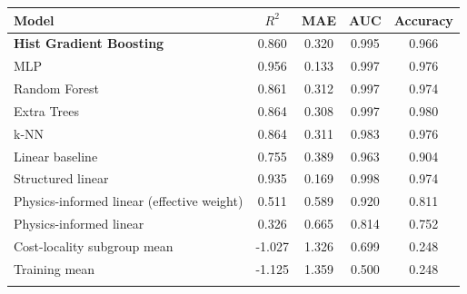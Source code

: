 \begin{tabular}{lcccc}
\toprule
Model & $R^2$ & MAE & AUC & Accuracy \\
\midrule
\textbf{Hist Gradient Boosting} & 0.860 & 0.320 & 0.995 & 0.966 \\
MLP & 0.956 & 0.133 & 0.997 & 0.976 \\
Random Forest & 0.861 & 0.312 & 0.997 & 0.974 \\
Extra Trees & 0.864 & 0.308 & 0.997 & 0.980 \\
k-NN & 0.864 & 0.311 & 0.983 & 0.976 \\
Linear baseline & 0.755 & 0.389 & 0.963 & 0.904 \\
\midrule
Structured linear & 0.935 & 0.169 & 0.998 & 0.974 \\
Physics-informed linear (effective weight) & 0.511 & 0.589 & 0.920 & 0.811 \\
Physics-informed linear & 0.326 & 0.665 & 0.814 & 0.752 \\
Cost-locality subgroup mean & -1.027 & 1.326 & 0.699 & 0.248 \\
Training mean & -1.125 & 1.359 & 0.500 & 0.248 \\
\botrule
\end{tabular}

